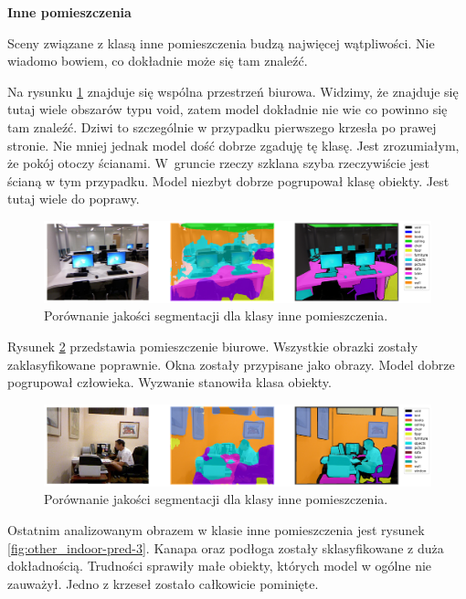 \noindent
\textbf{Inne pomieszczenia}

Sceny związane z klasą inne pomieszczenia budzą najwięcej wątpliwości. Nie wiadomo bowiem, co dokładnie może się tam znaleźć.

Na rysunku \ref{fig:other_indoor-pred-1} znajduje się wspólna przestrzeń biurowa. Widzimy, że znajduje się tutaj wiele obszarów typu void, zatem model dokładnie nie wie co powinno się tam znaleźć. Dziwi to szczególnie w przypadku pierwszego krzesła po prawej stronie. Nie mniej jednak model dość dobrze zgaduję tę klasę. Jest zrozumiałym, że pokój otoczy ścianami. W~gruncie rzeczy szklana szyba rzeczywiście jest ścianą w tym przypadku. Model niezbyt dobrze pogrupował klasę obiekty. Jest tutaj wiele do poprawy.

\begin{figure}[ht!]
    \centering
    \includegraphics[width=\textwidth]{img/preds_analysis/gt_vs_pred/other_indoor-1.png}
    \caption{Porównanie jakości segmentacji dla klasy inne pomieszczenia.}
    \label{fig:other_indoor-pred-1}
\end{figure}

Rysunek \ref{fig:other_indoor-pred-2} przedstawia pomieszczenie biurowe. Wszystkie obrazki zostały zaklasyfikowane poprawnie. Okna zostały przypisane jako obrazy. Model dobrze pogrupował człowieka. Wyzwanie stanowiła klasa obiekty.

\begin{figure}[ht!]
    \centering
    \includegraphics[width=\textwidth]{img/preds_analysis/gt_vs_pred/other_indoor-2.png}
    \caption{Porównanie jakości segmentacji dla klasy inne pomieszczenia.}
    \label{fig:other_indoor-pred-2}
\end{figure}





Ostatnim analizowanym obrazem w klasie inne pomieszczenia jest rysunek \ref{fig:other_indoor-pred-3}. Kanapa oraz podłoga zostały sklasyfikowane z duża dokładnością. Trudności sprawiły małe obiekty, których model w ogólne nie zauważył. Jedno z krzeseł zostało całkowicie pominięte.

